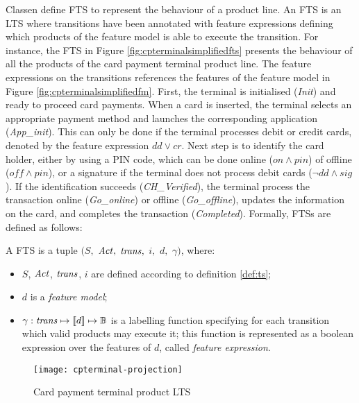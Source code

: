 Classen \etal \cite{Classen2013b} define \gls{FTS} to represent the behaviour of a product line. An \gls{FTS} is an \gls{LTS} where transitions have been annotated with feature expressions defining which products of the \gls{feature model} is able to execute the transition. For instance, the \gls{FTS} in Figure \ref{fig:cpterminalsimplifiedfts} presents the behaviour of all the products of the card payment terminal product line. The feature expressions on the transitions references the features of the feature model in Figure \ref{fig:cpterminalsimplifiedfm}. First, the terminal is initialised (\textit{Init}) and ready to proceed card payments. When a card is inserted, the terminal selects an appropriate payment method and launches the corresponding application (\textit{App\_init}). This can only be done if the terminal processes debit or credit cards, denoted by the feature expression $\mathit{dd} \vee \mathit{cr}$. Next step is to identify the card holder, either by using a \gls{PIN} code, which can be done online ($on \wedge pin$) of offline ($\mathit{off} \wedge \mathit{pin}$), or a signature if the terminal does not process debit cards ($\neg \mathit{dd} \wedge \mathit{sig}$). If the identification succeeds (\textit{CH\_Verified}), the terminal process the transaction online (\textit{Go\_online}) or offline (\textit{Go\_offline}), updates the information on the card, and completes the transaction (\textit{Completed}). Formally, \glspl{FTS} are defined as follows:
%
\begin{definition}
\label{def:fts}
A \gls{FTS} is a tuple $(S,$ $\mathit{Act},$ $\mathit{trans},$ $i,$ $d,$ $\gamma)$, where:
\begin{itemize}
\item $S$, $\mathit{Act}$, $\mathit{trans}$, $i$ are defined according to definition \ref{def:ts}; 
\item $d$ is a \emph{feature model}; 
\item $\gamma: \mathit{trans} \mapsto [\![ d]\!] \mapsto \mathbb{B}$  is a labelling function specifying for each transition which valid products may execute it; this function is represented as a boolean expression over the features of $d$, called \emph{\gls{feature expression}}.
\end{itemize}
\end{definition}

\begin{figure}[t]
	\centering
	\texttt{[image: cpterminal-projection]}
	\caption{Card payment terminal product \gls{LTS}}
	\label{fig:cpterminalprojection}
\end{figure}


